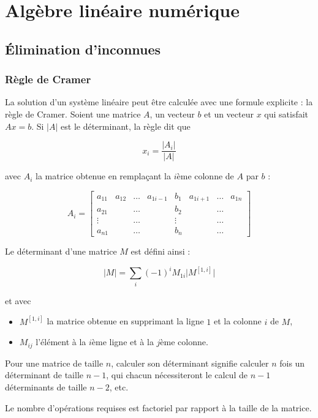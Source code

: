 \chapter{Algèbre linéaire numérique}

\section{Élimination d'inconnues}

	\subsection{Règle de Cramer}
	La solution d'un système linéaire peut être calculée avec une formule explicite : la règle de Cramer. Soient une matrice $A$, un vecteur $b$ et un vecteur $x$ qui satisfait $Ax = b$. Si $\vert A \vert$ est le déterminant, la règle dit que

	$$x_i = \frac{\vert A_i \vert }{\vert A \vert}$$

	avec $A_i$ la matrice obtenue en remplaçant la $i$ème colonne de $A$ par $b$ :
	
	$$A_i = \begin{bmatrix}
a_{11} & a_{12} & \dots & a_{1 i - 1} & b_1 & a_{1 i + 1} & \dots & a_{1 n} \\ 
a_{21} &   & \dots &   & b_2 &   & \dots &   \\ 
\vdots &   & \dots &   & \vdots &   & \dots &   \\ 
a_{n1} &   & \dots &   & b_n &   & \dots &  
\end{bmatrix} $$

	Le déterminant d'une matrice $M$ est défini ainsi :

	$$\vert M \vert = \sum_{i} (-1)^i M_{1 i} \vert M^{[1, i]} \vert$$

	et avec

	\begin{itemize}
		\item $M^{[1, i]}$ la matrice obtenue en supprimant la ligne $1$ et la colonne $i$ de $M$,
		\item $M_{ij}$ l'élément à la $i$ème ligne et à la $j$ème colonne.
	\end{itemize}

	Pour une matrice de taille $n$, calculer son déterminant signifie calculer $n$ fois un déterminant de taille $n - 1$, qui chacun nécessiteront le calcul de $n - 1$ déterminants de taille $n - 2$, etc.

	Le nombre d'opérations requises est factoriel par rapport à la taille de la matrice.


